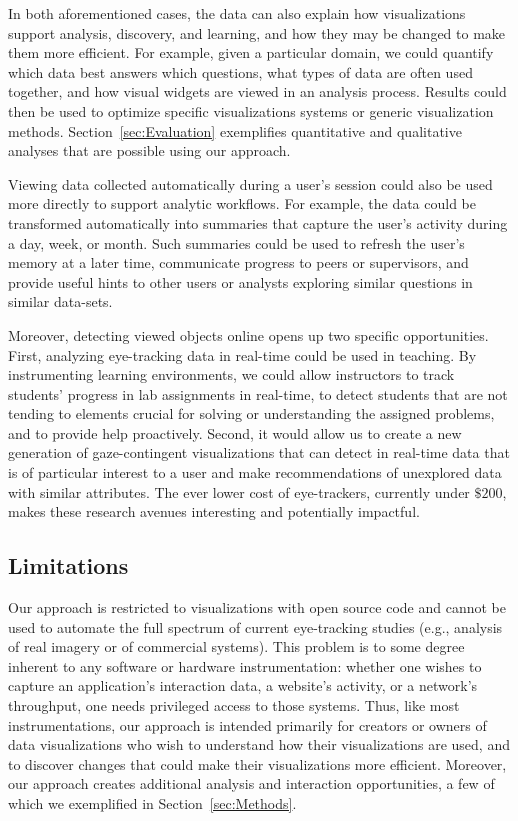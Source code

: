 In both aforementioned cases, the data can also explain how visualizations support analysis, discovery, and learning, and how they may be changed to make them more efficient. For example, given a particular domain, we could quantify which data best answers which questions, what types of data are often used together, and how visual widgets are viewed in an analysis process. Results could then be used to optimize specific visualizations systems or generic visualization methods.  Section~\ref{sec:Evaluation} exemplifies quantitative and qualitative analyses that are possible using our approach.   

Viewing data collected automatically during a user's session could also be used more directly to support analytic workflows. For example, the data could be transformed automatically into summaries that capture the user's activity during a day, week, or month. Such summaries could be used to refresh the user's memory at a later time, communicate progress to peers or supervisors, and provide useful hints to other users or analysts exploring similar questions in similar data-sets.

Moreover, detecting viewed objects online opens up two specific opportunities. First, analyzing eye-tracking data in real-time could be used in teaching. By instrumenting learning environments, we could allow instructors to track students' progress in lab assignments in real-time, to detect students that are not tending to elements crucial for solving or understanding the assigned problems, and to provide help proactively. Second, it would allow us to create a new generation of gaze-contingent visualizations that can detect in real-time data that is of particular interest to a user and make recommendations of unexplored data with similar attributes. The ever lower cost of eye-trackers, currently under $\$200$, makes these research avenues interesting and potentially impactful. 


\subsection{Limitations}
\label{sec:Limitations}
Our approach is restricted to visualizations with open source code and cannot be used to automate the full spectrum of current eye-tracking studies (e.g., analysis of real imagery or of commercial systems).   This problem is to some degree inherent to any software or hardware instrumentation: whether one wishes to capture an application's interaction data, a website's activity, or a network's throughput, one needs privileged access to those systems. Thus, like most instrumentations, our approach is intended primarily for creators or owners of data visualizations who wish to understand how their visualizations are used, and to discover changes that could make their visualizations more efficient. Moreover, our approach creates additional analysis and interaction opportunities, a few of which we exemplified in Section~\ref{sec:Methods}. 

